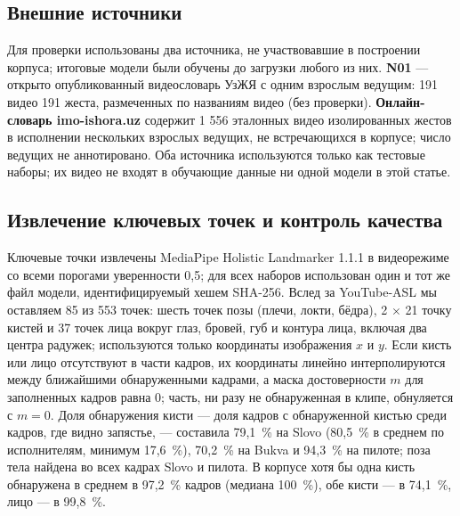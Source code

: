 \documentclass[a4paper,fleqn]{cas-dc}
\begin{document}
\hypertarget{ux432ux43dux435ux448ux43dux438ux435-ux438ux441ux442ux43eux447ux43dux438ux43aux438}{%
\subsection{Внешние источники}\label{ux432ux43dux435ux448ux43dux438ux435-ux438ux441ux442ux43eux447ux43dux438ux43aux438}}

Для проверки использованы два источника, не участвовавшие в построении корпуса; итоговые модели были обучены до загрузки любого из них. \textbf{N01} --- открыто опубликованный видеословарь УзЖЯ с одним взрослым ведущим: 191 видео 191 жеста, размеченных по названиям видео (без проверки). \textbf{Онлайн-словарь imo-ishora.uz} содержит 1 556 эталонных видео изолированных жестов в исполнении нескольких взрослых ведущих, не встречающихся в корпусе; число ведущих не аннотировано. Оба источника используются только как тестовые наборы; их видео не входят в обучающие данные ни одной модели в этой статье.

\hypertarget{ux438ux437ux432ux43bux435ux447ux435ux43dux438ux435-ux43aux43bux44eux447ux435ux432ux44bux445-ux442ux43eux447ux435ux43a-ux438-ux43aux43eux43dux442ux440ux43eux43bux44c-ux43aux430ux447ux435ux441ux442ux432ux430}{%
\subsection{Извлечение ключевых точек и контроль качества}\label{ux438ux437ux432ux43bux435ux447ux435ux43dux438ux435-ux43aux43bux44eux447ux435ux432ux44bux445-ux442ux43eux447ux435ux43a-ux438-ux43aux43eux43dux442ux440ux43eux43bux44c-ux43aux430ux447ux435ux441ux442ux432ux430}}

Ключевые точки извлечены MediaPipe Holistic Landmarker 1.1.1 \cite{docs_mediapipe_holistic_landmarker} в видеорежиме со всеми порогами уверенности 0,5; для всех наборов использован один и тот же файл модели, идентифицируемый хешем SHA-256. Вслед за YouTube-ASL \cite{2023_uthus_youtube_asl} мы оставляем 85 из 553 точек: шесть точек позы (плечи, локти, бёдра), 2 $\times$ 21 точку кистей и 37 точек лица вокруг глаз, бровей, губ и контура лица, включая два центра радужек; используются только координаты изображения \(x\) и \(y\). Если кисть или лицо отсутствуют в части кадров, их координаты линейно интерполируются между ближайшими обнаруженными кадрами, а маска достоверности \(m\) для заполненных кадров равна 0; часть, ни разу не обнаруженная в клипе, обнуляется с \(m = 0\). Доля обнаружения кисти --- доля кадров с обнаруженной кистью среди кадров, где видно запястье, --- составила 79,1~\% на Slovo (80,5~\% в среднем по исполнителям, минимум 17,6~\%), 70,2~\% на Bukva и 94,3~\% на пилоте; поза тела найдена во всех кадрах Slovo и пилота. В корпусе хотя бы одна кисть обнаружена в среднем в 97,2~\% кадров (медиана 100~\%), обе кисти --- в 74,1~\%, лицо --- в 99,8~\%.
\end{document}

